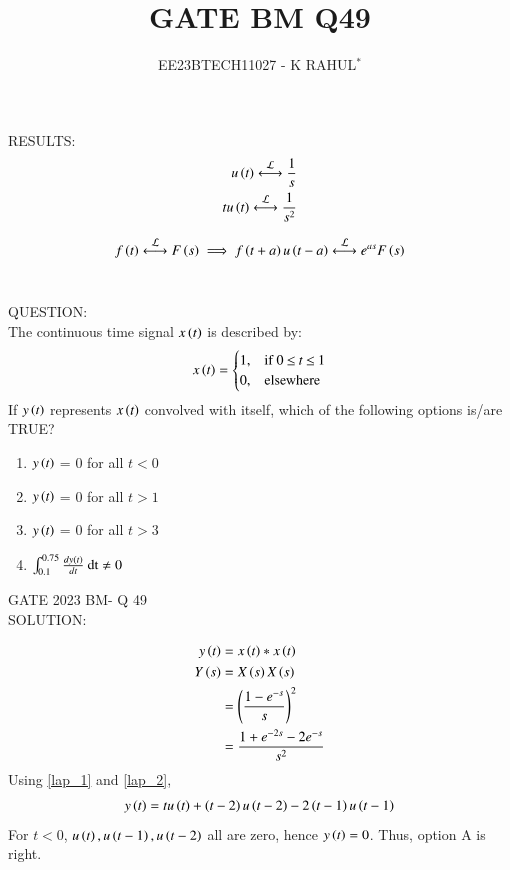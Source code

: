 \documentclass[journal,12pt,twocolumn]{IEEEtran}
\theoremstyle{remark}
\begin{document}

\vspace{3cm}
\title{GATE BM Q49}
\author{EE23BTECH11027 - K RAHUL$^{*}$%
}
\maketitle
\newpage
\bigskip
\renewcommand{\thefigure}{\theenumi}
\renewcommand{\thetable}{\theenumi}
RESULTS: \\
\begin{align}
u\brak{t} \system{L} \frac{1}{s}\\
tu\brak{t} \system{L} \frac{1}{s^2} \label{lap_1}
\end{align}
	
\begin{align}
    f\brak{t} \system{L} F\brak{s}  \implies f\brak{t+a}u\brak{t-a} \system{L} e^{as}F\brak{s} \label{lap_2}
\end{align}\\
\bigskip

QUESTION:\\
The continuous time signal $x\left(t\right)$ is described by:
\begin{align}
x\left(t\right)=
    \begin{cases}
        1, & \text{if } 0\: {\displaystyle \leq }\:t\:{\displaystyle \leq }\:1\\
        0, & \text{elsewhere}
    \end{cases} 
\end{align}
If $y\left(t\right)$ represents $x\left(t\right)$ convolved with itself, which of the following options is/are TRUE?
\begin{enumerate}[label = \Alph*]
    \item $y\left(t\right)$ = 0 for all $t<0$\\
    \item $y\left(t\right)$ = 0 for all $t>1$\\
    \item $y\left(t\right)$ = 0 for all $t>3$\\
    \item $\int_{0.1}^{0.75} \frac{dy\left(t\right)}{dt}\: \text{dt} \neq 0$
\end{enumerate} \hfill{GATE 2023 BM- Q 49}\\
\bigskip 
\bigskip
SOLUTION:
\begin{table}[ht]

\end{table}
\bigskip
\begin{align}
    y\left(t\right) &= x\left(t\right) * x\left(t\right)\\
    Y\left(s\right) &= X\left(s\right)X\left(s\right)\\
    &=\left(\frac{1-e^{-s}}{s}\right)^2\\
    &=\frac{1+e^{-2s}-2e^{-s}}{s^2}
\end{align}
Using \eqref{lap_1} and \eqref{lap_2}, 
\begin{align}
    y\left(t\right) = tu\left(t\right) + \left(t-2\right)u\left(t-2\right) -2\left(t-1\right)u\left(t-1\right)
\end{align}
For $t<0$, $u\left(t\right), u\left(t-1\right), u\left(t-2\right)$ all are zero, hence $y\left(t\right) = 0$. Thus, option A is right.\\
\end{document}
